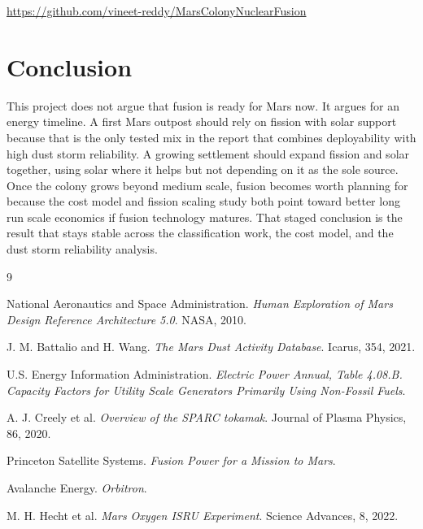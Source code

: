 \documentclass[11pt]{article}
\begin{document}
\begin{center}
\href{https://github.com/vineet-reddy/MarsColonyNuclearFusion}{https://github.com/vineet-reddy/MarsColonyNuclearFusion}
\end{center}

\section{Conclusion}

This project does not argue that fusion is ready for Mars now. It argues for an energy timeline. A first Mars outpost should rely on fission with solar support because that is the only tested mix in the report that combines deployability with high dust storm reliability. A growing settlement should expand fission and solar together, using solar where it helps but not depending on it as the sole source. Once the colony grows beyond medium scale, fusion becomes worth planning for because the cost model and fission scaling study both point toward better long run scale economics if fusion technology matures. That staged conclusion is the result that stays stable across the classification work, the cost model, and the dust storm reliability analysis.

\begin{thebibliography}{9}

National Aeronautics and Space Administration.
\newblock \emph{Human Exploration of Mars Design Reference Architecture 5.0}.
\newblock NASA, 2010.

J. M. Battalio and H. Wang.
\newblock \emph{The Mars Dust Activity Database}.
\newblock Icarus, 354, 2021.

U.S. Energy Information Administration.
\newblock \emph{Electric Power Annual, Table 4.08.B. Capacity Factors for Utility Scale Generators Primarily Using Non-Fossil Fuels}.

A. J. Creely et al.
\newblock \emph{Overview of the SPARC tokamak}.
\newblock Journal of Plasma Physics, 86, 2020.

Princeton Satellite Systems.
\newblock \emph{Fusion Power for a Mission to Mars}.

Avalanche Energy.
\newblock \emph{Orbitron}.

M. H. Hecht et al.
\newblock \emph{Mars Oxygen ISRU Experiment}.
\newblock Science Advances, 8, 2022.

\end{thebibliography}
\end{document}
